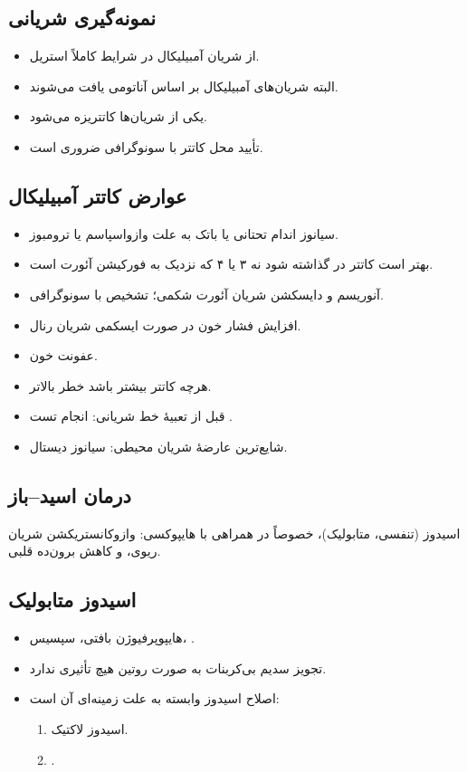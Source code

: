 \documentclass[12pt,a4paper]{article}
\begin{document}
\subsection*{نمونه‌گیری شریانی}
\begin{itemize}
\item از شریان آمبیلیکال در شرایط کاملاً استریل.
\item البته شریان‌های آمبیلیکال بر اساس آناتومی یافت می‌شوند.
\item یکی از شریان‌ها کاتتریزه می‌شود.
\item تأیید محل کاتتر با سونوگرافی ضروری است.
\end{itemize}
\subsection*{عوارض کاتتر آمبیلیکال}
\begin{itemize}
\item سیانوز اندام تحتانی یا باتک به علت وازواسپاسم یا ترومبوز.
\item بهتر است کاتتر در  گذاشته شود نه ۳ یا ۴ که نزدیک به فورکیشن آئورت است.
\item آنوریسم و دایسکشن شریان آئورت شکمی؛ تشخیص با سونوگرافی.
\item افزایش فشار خون در صورت ایسکمی شریان رنال.
\item عفونت خون.
\item هرچه کاتتر بیشتر باشد خطر بالاتر.
\end{itemize}
\begin{itemize}
\item قبل از تعبیهٔ خط شریانی: انجام تست .
\item شایع‌ترین عارضهٔ  شریان محیطی: سیانوز دیستال.
\end{itemize}
\subsection*{درمان اسید–باز}
اسیدوز (تنفسی، متابولیک)، خصوصاً در همراهی با هایپوکسی: وازوکانستریکشن شریان ریوی،  و کاهش برون‌ده قلبی.

\subsection*{اسیدوز متابولیک}
\begin{itemize}
\item هایپوپرفیوژن بافتی، سپسیس، .
\item تجویز سدیم بی‌کربنات به صورت روتین هیچ تأثیری ندارد.
\item اصلاح اسیدوز وابسته به علت زمینه‌ای آن است:
\begin{enumerate}
\item اسیدوز لاکتیک.
\item {}.
\end{enumerate}
\end{itemize}
\end{document}
